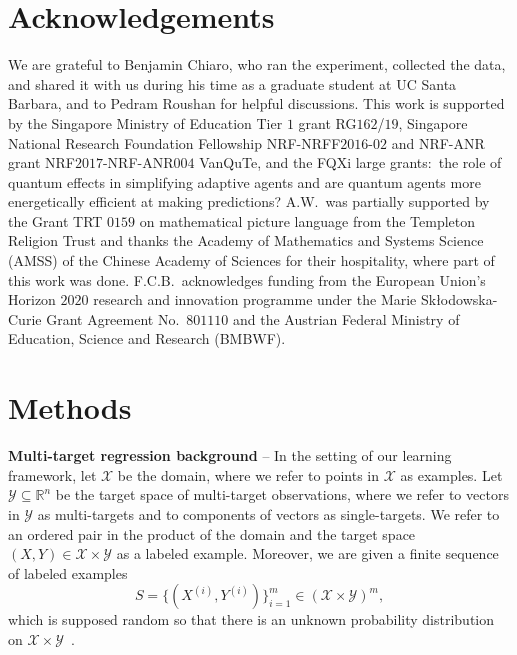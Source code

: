 \documentclass[aps,twocolumn,superscriptaddress,floatfix,preprintnumbers,showkeys]{revtex4}
\begin{document}
\section*{Acknowledgements}
We are grateful to Benjamin Chiaro, who ran the experiment, collected the data, and shared it with us during his time as a graduate student at UC Santa Barbara, and to Pedram Roushan for helpful discussions. This work is supported by the Singapore Ministry of Education Tier $1$ grant RG$162$/$19$, Singapore National Research Foundation Fellowship NRF-NRFF$2016$-$02$ and NRF-ANR grant NRF$2017$-NRF-ANR$004$ VanQuTe, and the FQXi large grants:\ the role of quantum effects in simplifying adaptive agents and are quantum agents more energetically efficient at making predictions? A.W.\ was partially supported by the Grant TRT $0159$ on mathematical picture language from the Templeton Religion Trust and thanks the Academy of Mathematics and Systems Science (AMSS) of the Chinese Academy of Sciences for their hospitality, where part of this work was done. F.C.B.\ acknowledges funding from the European Union’s Horizon $2020$ research and innovation programme under the Marie Skłodowska-Curie Grant Agreement No.\ $801110$ and the Austrian Federal Ministry of Education, Science and Research (BMBWF).

\section*{Methods}

\textbf{Multi-target regression background} -- In the setting of our learning framework, let $\mathcal{X}$ be the domain, where we refer to points in $\mathcal{X}$ as examples. Let $\mathcal{Y} \subseteq \mathbb{R}^{n}$ be the target space of multi-target observations, where we refer to vectors in $\mathcal{Y}$ as multi-targets and to components of vectors as single-targets. We refer to an ordered pair in the product of the domain and the target space $(X,Y) \in \mathcal{X} \times \mathcal{Y}$ as a labeled example. Moreover, we are given a finite sequence of labeled examples
\begin{equation}
\label{eq:labeled_examples}
S = \{ (X^{(i)}, Y^{(i)}) \}_{i=1}^{m} \in (\mathcal{X} \times \mathcal{Y})^{m},
\end{equation}
which is supposed random so that there is an unknown probability distribution on $\mathcal{X} \times \mathcal{Y}$~\cite{Haussler_1992, Kearns_1994_1, Kearns_1994_2}.  
\end{document}
